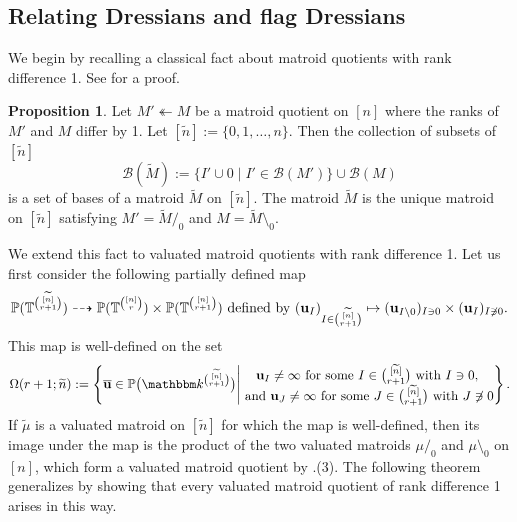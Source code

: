 \documentclass[11pt]{amsart}
\newcommand{\PP}{\mathbb P}
\newcommand{\TT}{\mathbb T}
\newcommand{\bb}{\mathcal B}
\newcommand{\kk}{\mathbbm k}
\newcommand{\bu}{{\mathbf u}}
\theoremstyle{definition}
\newtheorem{prop}[thm]{Proposition}
\begin{document}
\subsection{Relating Dressians and flag Dressians}
\label{subsec:drandfldr}

We begin by recalling a classical fact about matroid quotients with rank difference 1.  See \cite[\S7.3]{Oxl11} for a proof.

\begin{prop}\label{prop:elemquot}
Let $M'\twoheadleftarrow M$ be a matroid quotient on $[n]$ where the ranks of $M'$ and $M$ differ by 1.  Let $[\widetilde n] := \{0,1, \ldots, n\}$.  Then the collection of subsets of $[\widetilde n]$
\[
\bb(\widetilde{M}) := \{I'\cup 0 \mid I'\in \bb(M')\} \cup  \bb(M)
\]
is a set of bases of a matroid $\widetilde M$ on $[\widetilde n]$.  The matroid $\widetilde M$ is the unique matroid on $[\widetilde n]$ satisfying $M' = \widetilde{M}/_0$ and $M = \widetilde{M}\setminus_0$.
\end{prop}

We extend this fact to valuated matroid quotients with rank difference 1.  Let us first consider the following partially defined map
\[
\PP(\TT^{[\widetilde n]\choose r+1}) \dashrightarrow \PP(\TT^{[n] \choose r}) \times \PP(\TT^{[n]\choose r+1}) \textnormal{ defined by } (\bu_I)_{I\in {[\widetilde n]\choose r+1}} \mapsto (\bu_{I\setminus 0})_{I\ni 0} \times (\bu_I)_{I\not\ni 0}.
\]
This map is well-defined on the set 
\[
\Omega(r+1;\widetilde n) := \left\{\overline{\bu} \in \PP \big(\kk^{[\widetilde n]\choose r+1} \big) \middle | \begin{matrix} \bu_I \neq \infty \textnormal{ for some $I \in \textstyle \binom{[\widetilde n]}{r+1}$ with $I\ni 0$},\\ \textnormal{ and }\bu_{J} \neq \infty \textnormal{ for some $J\in \textstyle \binom{[\widetilde n]}{r+1}$ with $J\not\ni 0$}\end{matrix}\right\}.
\]
If $\widetilde \mu$ is a valuated matroid on $[\widetilde n]$ for which the map is well-defined, then its image under the map is the product of the two valuated matroids $\mu/_0$ and $\mu\setminus_0$ on $[n]$, which form a valuated matroid quotient by .(3).  The following theorem generalizes  by showing that every valuated matroid quotient of rank difference 1 arises in this way.
\end{document}
